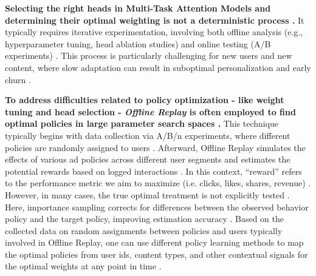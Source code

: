 \documentclass[final]{anthology-ch}         %
\begin{document}
\textbf{Selecting the right heads in Multi-Task Attention Models and determining their optimal weighting is not a deterministic process \cite{Michel2019} \cite{Voita2019}.} It typically requires iterative experimentation, involving both offline analysis (e.g., hyperparameter tuning, head ablation studies) and online testing (A/B experiments) \cite{Michel2019} \cite{kang2018sasrec}. This process is particularly challenging for new users and new content, where slow adaptation can result in suboptimal personalization and early churn \cite{Schein2002, Bobadilla2013}. 

\textbf{To address difficulties related to policy optimization - like weight tuning and head selection - \textit{Offline Replay} is often employed to find optimal policies in large parameter search spaces  \cite{agarwal2016statistical} \cite{levine2020offline} \cite{agarwal2020optimistic}.} This technique typically begins with data collection via A/B/n experiments, where different policies are randomly assigned to users \cite{agarwal2019online} \cite{chen2009large}. Afterward, Offline Replay simulates the effects of various ad policies across different user segments and estimates the potential rewards based on logged interactions \cite{agarwal2016statistical}. In this context, “reward” refers to the performance metric we aim to maximize (i.e. clicks, likes, shares, revenue) \cite{wu2017returning}. However, in many cases, the true optimal treatment is not explicitly tested \cite{agarwal2019online}. Here, importance sampling corrects for differences between the observed behavior policy and the target policy, improving estimation accuracy \cite{Sutton1998} \cite{dudik2011doubly}.  Based on the collected data on random assignments between policies and users typically involved in Offline Replay, one can use different policy learning methods to map the optimal policies from user ids, content types, and other contextual signals for the optimal weights at any point in time \cite{swaminathan2015counterfactual}. 



\end{document}
